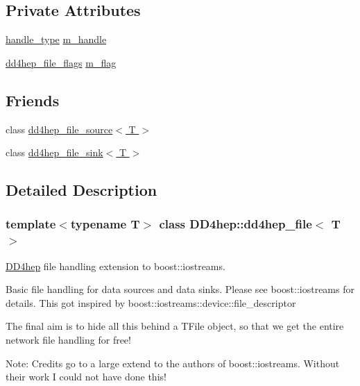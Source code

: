 \subsection*{Private Attributes}
\begin{DoxyCompactItemize}
\item 
\hyperlink{class_d_d4hep_1_1dd4hep__file_a4d79f8d433cd7831ff818691424cd6fc}{handle\+\_\+type} \hyperlink{class_d_d4hep_1_1dd4hep__file_a198f202b4b952426543a8df41a21a232}{m\+\_\+handle}
\item 
\hyperlink{namespace_d_d4hep_a31d19f9b0ce567067d2897fbda1761e5}{dd4hep\+\_\+file\+\_\+flags} \hyperlink{class_d_d4hep_1_1dd4hep__file_ae278513f83e549eda9cf0e01998a6726}{m\+\_\+flag}
\end{DoxyCompactItemize}
\subsection*{Friends}
\begin{DoxyCompactItemize}
\item 
class \hyperlink{class_d_d4hep_1_1dd4hep__file_a6b3fcc7f94c708f7b47316d1ac4b1cf4}{dd4hep\+\_\+file\+\_\+source$<$ T $>$}
\item 
class \hyperlink{class_d_d4hep_1_1dd4hep__file_a0fff7b3c8e8c9c913c387a26c6829a36}{dd4hep\+\_\+file\+\_\+sink$<$ T $>$}
\end{DoxyCompactItemize}


\subsection{Detailed Description}
\subsubsection*{template$<$typename T$>$\newline
class D\+D4hep\+::dd4hep\+\_\+file$<$ T $>$}

\hyperlink{namespace_d_d4hep}{D\+D4hep} file handling extension to boost\+::iostreams. 

Basic file handling for data sources and data sinks. Please see boost\+::iostreams for details. This got inspired by boost\+::iostreams\+::device\+::file\+\_\+descriptor

The final aim is to hide all this behind a T\+File object, so that we get the entire network file handling for free!

Note\+: Credits go to a large extend to the authors of boost\+::iostreams. Without their work I could not have done this!

